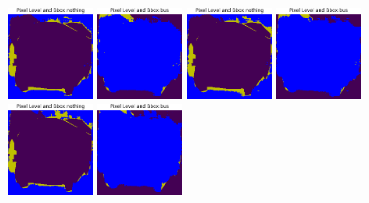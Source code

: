 \begin{figure}[h!tpb]
  \centering
  \includegraphics[width=0.2\textwidth]{../../modelos-entrenados/unet-nonlocal-conv/ejecucion10/predtrainmid0}
  \vrule
  \includegraphics[width=0.2\textwidth]{../../modelos-entrenados/unet-nonlocal-conv/ejecucion10/predtrainmid6}
  \vrule
  \includegraphics[width=0.2\textwidth]{../../modelos-entrenados/unet-nonlocalextra-conv/ejecucion9/predtrainmid0}
  \vrule
  \includegraphics[width=0.2\textwidth]{../../modelos-entrenados/unet-nonlocalextra-conv/ejecucion9/predtrainmid6}
  \vrule
  \includegraphics[width=0.2\textwidth]{../../modelos-entrenados/unet-semnonlocal-conv/ejecucion11/predtrainmid0}
  \vrule
  \includegraphics[width=0.2\textwidth]{../../modelos-entrenados/unet-semnonlocal-conv/ejecucion11/predtrainmid6}

\end{figure}
